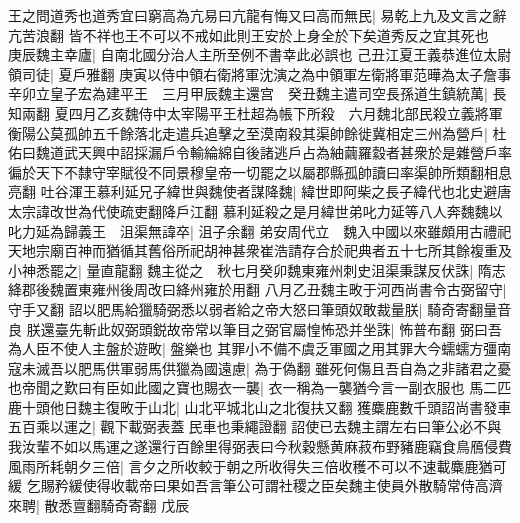 王之問道秀也道秀宜曰窮高為亢易曰亢龍有悔又曰高而無民|{
	易乾上九及文言之辭亢苦浪翻}
皆不祥也王不可以不戒如此則王安於上身全於下矣道秀反之宜其死也　庚辰魏主幸廬|{
	自南北國分治人主所至例不書幸此必誤也}
己丑江夏王義恭進位太尉領司徒|{
	夏戶雅翻}
庚寅以侍中領右衛將軍沈演之為中領軍左衛將軍范曄為太子詹事　辛卯立皇子宏為建平王　三月甲辰魏主還宫　癸丑魏主遣司空長孫道生鎮統萬|{
	長知兩翻}
夏四月乙亥魏侍中太宰陽平王杜超為帳下所殺　六月魏北部民殺立義將軍衡陽公莫孤帥五千餘落北走遣兵追擊之至漠南殺其渠帥餘徙冀相定三州為營戶|{
	杜佑曰魏道武天興中詔採漏戶令輸綸綿自後諸逃戶占為紬繭羅縠者甚衆於是雜營戶率徧於天下不隸守宰賦役不同景穆皇帝一切罷之以屬郡縣孤帥讀曰率渠帥所類翻相息亮翻}
吐谷渾王慕利延兄子緯世與魏使者謀降魏|{
	緯世即阿柴之長子緯代也北史避唐太宗諱改世為代使疏吏翻降戶江翻}
慕利延殺之是月緯世弟叱力延等八人奔魏魏以叱力延為歸義王　沮渠無諱卒|{
	沮子余翻}
弟安周代立　魏入中國以來雖頗用古禮祀天地宗廟百神而猶循其舊俗所祀胡神甚衆崔浩請存合於祀典者五十七所其餘複重及小神悉罷之|{
	量直龍翻}
魏主從之　秋七月癸卯魏東雍州刺史沮渠秉謀反伏誅|{
	隋志絳郡後魏置東雍州後周改曰絳州雍於用翻}
八月乙丑魏主畋于河西尚書令古弼留守|{
	守手又翻}
詔以肥馬給獵騎弼悉以弱者給之帝大怒曰筆頭奴敢裁量朕|{
	騎奇寄翻量音良}
朕還臺先斬此奴弼頭鋭故帝常以筆目之弼官屬惶怖恐并坐誅|{
	怖普布翻}
弼曰吾為人臣不使人主盤於遊畋|{
	盤樂也}
其罪小不備不虞乏軍國之用其罪大今蠕蠕方彊南寇未滅吾以肥馬供軍弱馬供獵為國遠慮|{
	為于偽翻}
雖死何傷且吾自為之非諸君之憂也帝聞之歎曰有臣如此國之寶也賜衣一襲|{
	衣一稱為一襲猶今言一副衣服也}
馬二匹鹿十頭他日魏主復畋于山北|{
	山北平城北山之北復扶又翻}
獲麋鹿數千頭詔尚書發車五百乘以運之|{
	觀下載弼表蓋民車也秉繩證翻}
詔使已去魏主謂左右曰筆公必不與我汝輩不如以馬運之遂還行百餘里得弼表曰今秋穀懸黄麻菽布野豬鹿竊食鳥鴈侵費風雨所耗朝夕三倍|{
	言夕之所收較于朝之所收得失三倍收穫不可以不速載麋鹿猶可緩}
乞賜矜緩使得收載帝曰果如吾言筆公可謂社稷之臣矣魏主使員外散騎常侍高濟來聘|{
	散悉亶翻騎奇寄翻}
戊辰

